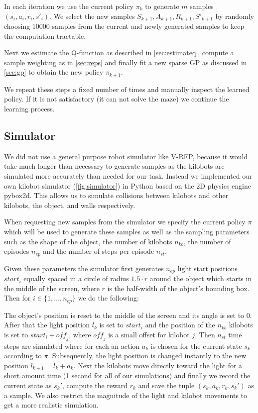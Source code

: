 \documentclass[twoside]{article}
\begin{document}
In each iteration we use the current policy $\pi_k$ to generate $m$ samples
$(s_i, a_i, r_i, s'_i)$.
We select the new samples $S_{k+1}, A_{k+1}, R_{k+1}, S'_{k+1}$ by randomly
choosing 10000 samples from the current and newly generated samples to keep the
computation tractable.

Next we estimate the Q-function as described in \ref{sec:estimateq},
compute a sample weighting as in \ref{sec:reps} and finally fit a new sparse
GP as discussed in \ref{sec:gp} to obtain the new policy $\pi_{k+1}$.

We repeat these steps a fixed number of times and manually inspect the learned
policy. If it is not satisfactory (it can not solve the maze) we continue the
learning process.

\subsection{Simulator}
\label{sec:simulator}

\newcommand\nkb{n_\mathit{kb}}
\newcommand\nep{n_\mathit{ep}}
\newcommand\nst{n_\mathit{st}}

We did not use a general purpose robot simulator like V-REP\cite{vrep}, because
it would take much longer than necessary to generate samples as the kilobots are
simulated more accurately than needed for our task. Instead we implemented our own
kilobot simulator (\autoref{fig:simulator}) in Python based on the 2D
physics engine pybox2d\cite{pybox2d}. This allows us to simulate collisions
between kilobots and other kilobots, the object, and walls respectively.

When requesting new samples from the simulator we specify the current policy
$\pi$ which will be used to generate these samples as well as the sampling
parameters such as the shape of the object, the number of kilobots $\nkb$, the
number of episodes $\nep$ and the number of steps per episode $\nst$.

Given these parameters the simulator first generates $\nep$ light start
positions $\mathit{start}_i$ equally spaced in a circle of radius $1.5 \cdot r$
around the object which starts in the middle of the screen, where $r$ is the
half-width of the object's bounding box. Then for $i \in \{1, \dots, \nep\}$ we
do the following:

The object's position is reset to the middle of the screen and its angle is set
to 0. After that the light position $l_k$ is set to
$\mathit{start}_i$
and the position of the $\nkb$ kilobots is set to $\mathit{start}_i + \mathit{off}_j$,
where $\mathit{off}_j$ is a small offset for kilobot $j$.
Then $\nst$ time steps are simulated where for each an action $a_k$ is chosen
for the current state $s_k$ according to $\pi$. Subsequently, the light position
is changed instantly to the new position $l_{k+1} = l_k + a_k$.
Next the kilobots move directly toward the light for
a short amount time (1 second for all of our simulations) and finally we record
the current state as $s_k'$, compute the reward $r_k$ and save the tuple $(s_k,
a_k, r_k, s_k')$ as a sample. We also restrict the magnitude of the light and
kilobot movements to get a more realistic simulation.
\end{document}
